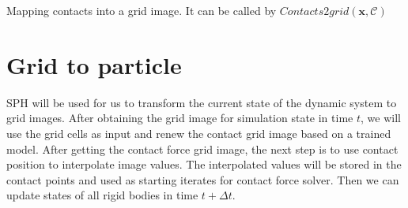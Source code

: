     \begin{algorithm}[!h]
        \caption{Mapping contacts into a grid image. It can be called by $Contacts2grid(\mathbf{x}, \mathcal{C})$}
        \label{contactgrid}
    \end{algorithm}


\section{Grid to particle}
    SPH will be used for us to transform the current state of the dynamic system to grid images. After obtaining the grid image for simulation state in time $t$, we will use the grid cells as input and renew the contact grid image based on a trained model. After getting the contact force grid image, the next step is to use contact position to interpolate image values. The interpolated values will be stored in the contact points and used as starting iterates for contact force solver. Then we can update states of all rigid bodies in time $t+\Delta{t}$.

